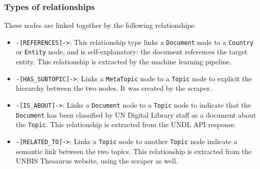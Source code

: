 \subsubsection{Types of relationships} \label{sssec:types-of-relationships}

These nodes are linked together by the following relationships:

\begin{itemize}
    \item \texttt{-[REFERENCES]->}:
          This relationship type links a \texttt{Document} node to a \texttt{Country} or \texttt{Entity} node, and is self-explanatory: the document references the target entity. This relationship is extracted by the machine learning pipeline.

    \item \texttt{-[HAS\_SUBTOPIC]->}:
          Links a \texttt{MetaTopic} node to a \texttt{Topic} node to explicit the hierarchy between the two nodes. It was created by the scraper.

    \item \texttt{-[IS\_ABOUT]->}:
          Links a \texttt{Document} node to a \texttt{Topic} node to indicate that the \texttt{Document} has been classified by UN Digital Library staff as a document about the \texttt{Topic}. This relationship is extracted from the UNDL API response.

    \item \texttt{-[RELATED\_TO]->}:
          Links a \texttt{Topic} node to another \texttt{Topic} node indicate a semantic link between the two topics. This relationship is extracted from the UNBIS Thesaurus website, using the scraper as well.

\end{itemize}
